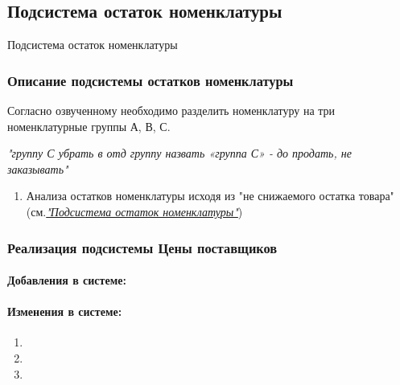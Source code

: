 \subsection{Подсистема остаток номенклатуры} \hypertarget{3_1}{Подсистема остаток номенклатуры}
\subsubsection{Описание подсистемы остатков номенклатуры}
Согласно озвученному необходимо разделить номенклатуру на три номенклатурные группы А, В, С.
\begin{displayquote}
	\textit{"группу С убрать в отд группу назвать «группа С» - до продать, не заказывать"}
\end{displayquote} 
\begin{enumerate}	
	\item Анализа остатков номенклатуры исходя из "не снижаемого остатка товара"  (см.\hyperlink{3_1}{\textit {"Подсистема остаток номенклатуры"}})
\end{enumerate}
\subsubsection{Реализация подсистемы Цены поставщиков}
\paragraph{Добавления в системе:}
\paragraph{Изменения в системе:}
\begin{enumerate}	
	\item 
	\item 
	\item 
\end{enumerate}